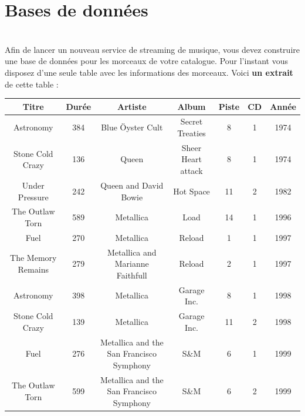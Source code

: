 \documentclass[a4paper,10pt,french]{book}
\begin{document}


\section*{Bases de données}
\exo\\

Afin de lancer un nouveau service de streaming de musique, vous devez construire une base de données pour les morceaux de votre catalogue. Pour l’instant vous disposez d’une seule table avec les informations des morceaux. Voici \textbf{un extrait} de cette table :

\begin{center}
    \footnotesize
    \begin{tabular}{|c|c|c|c|c|c|c|}
        \hline
        \rowcolor{UGLiOrange} \color{white}\textbf{Titre} &\color{white}\textbf{Durée}&\color{white}\textbf{Artiste}	&\color{white}\textbf{Album}&\color{white}\textbf{Piste}&\color{white}\textbf{CD}	& \color{white}\textbf{Année}\\
        \hline
        Astronomy			&384	&Blue Öyster Cult 							&Secret Treaties		&8	&1	&1974\\
        \hline
        Stone Cold Crazy	&136	&Queen										&Sheer Heart attack		&8	&1	&1974\\
        \hline
        Under Pressure		&242 	&Queen and David Bowie						&Hot Space				&11	&2	&1982\\
        \hline
        The Outlaw Torn 	&589 	&Metallica									&Load					&14	&1	&1996\\
        \hline
        Fuel				&270 	&Metallica									&Reload					&1	&1	&1997\\
        \hline
        The Memory Remains	&279 	&Metallica and Marianne Faithfull			&Reload					&2	&1	&1997\\
        \hline
        Astronomy			&398 	&Metallica									&Garage Inc.			&8	&1	&1998\\
        \hline
        Stone Cold Crazy	&139	&Metallica									&Garage Inc.			&11	&2	&1998\\
        \hline
        Fuel				&276 	&Metallica and the San Francisco Symphony	&S\&M					&6	&1	&1999\\
        \hline
        The Outlaw Torn		&599	&Metallica and the San Francisco Symphony	&S\&M 					&6	&2	&1999\\
        \hline
    \end{tabular}			
\end{center}			
\end{document}
